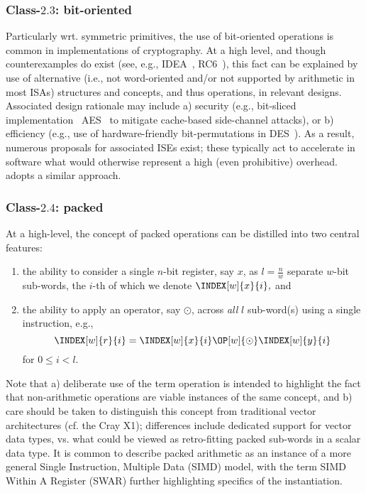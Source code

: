 
\subsubsection{Class-$2.3$: bit-oriented}
\label{sec:bg:feature:2:3}

Particularly wrt. symmetric primitives, the use of bit-oriented operations 
is common in implementations of cryptography.  At a high level, and though 
counterexamples do exist 
(see, e.g., IDEA~\cite{SCARV:LaiMas:90}, RC6~\cite{SCARV:RRSY:98}),
this fact can be explained by use of alternative (i.e., not word-oriented
and/or not supported by arithmetic in most ISAs) structures and concepts,
and thus operations, in relevant designs.  Associated design rationale may
include
a) security
   (e.g., bit-sliced implementation~\cite{SCARV:KasSch:09} AES~\cite{SCARV:FIPS:197} to mitigate cache-based side-channel attacks),
   or
b) efficiency
   (e.g., use of hardware-friendly bit-permutations in DES~\cite{SCARV:FIPS:46_3}).
As a result, numerous proposals for associated ISEs exist; these typically
act to accelerate in software what would otherwise represent a high (even 
prohibitive) overhead.  \XCID adopts a similar approach.


\subsubsection{Class-$2.4$: packed}
\label{sec:bg:feature:2:4}

At a high-level, the concept of packed operations can be distilled into two 
central features:

\begin{enumerate}
\item the ability to consider a single $n$-bit register, 
      say $x$, 
      as $l = \frac{n}{w}$ separate $w$-bit sub-words, the $i$-th of which
      we denote
      $
      \INDEX[w]{x}{i} ,
      $
      and
\item the ability to apply an operator,
      say $\odot$,
      across {\em all} $l$ sub-word(s) using a single instruction, e.g.,
      \[
      \INDEX[w]{r}{i} = \INDEX[w]{x}{i} \OP[w]{\odot} \INDEX[w]{y}{i}
      \]
      for $0 \leq i < l$.
\end{enumerate}

\noindent
Note that
a) deliberate use of the term operation is intended to highlight the fact 
   that non-arithmetic operations are viable instances of the same concept,
   and
b) care should be taken to distinguish this concept from traditional vector 
   architectures
   (cf. the Cray X1);
   differences include dedicated support for vector data types, vs. what
   could be viewed as retro-fitting packed sub-words in a scalar data type.
It is common to describe packed arithmetic as an instance of a more general
Single Instruction, Multiple Data (SIMD) model, with the term SIMD Within 
A Register (SWAR) further highlighting specifics of the instantiation.

